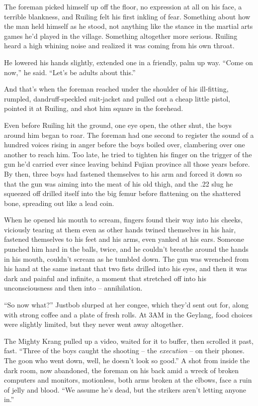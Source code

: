 The foreman picked himself up off the floor, no expression at all
on his face, a terrible blankness, and Ruiling felt his first
inkling of fear. Something about how the man held himself as he
stood, not anything like the stance in the martial arts games he'd
played in the village. Something altogether more serious. Ruiling
heard a high whining noise and realized it was coming from his own
throat.

He lowered his hands slightly, extended one in a friendly, palm up
way. ``Come on now,'' he said. ``Let's be adults about this.''

And that's when the foreman reached under the shoulder of his
ill-fitting, rumpled, dandruff-speckled suit-jacket and pulled out
a cheap little pistol, pointed it at Ruiling, and shot him square
in the forehead.

Even before Ruiling hit the ground, one eye open, the other shut,
the boys around him began to roar. The foreman had one second to
register the sound of a hundred voices rising in anger before the
boys boiled over, clambering over one another to reach him. Too
late, he tried to tighten his finger on the trigger of the gun he'd
carried ever since leaving behind Fujian province all those years
before. By then, three boys had fastened themselves to his arm and
forced it down so that the gun was aiming into the meat of his old
thigh, and the .22 slug he squeezed off drilled itself into the big
femur before flattening on the shattered bone, spreading out like a
lead coin.

When he opened his mouth to scream, fingers found their way into
his cheeks, viciously tearing at them even as other hands twined
themselves in his hair, fastened themselves to his feet and his
arms, even yanked at his ears. Someone punched him hard in the
balls, twice, and he couldn't breathe around the hands in his
mouth, couldn't scream as he tumbled down. The gun was wrenched
from his hand at the same instant that two fists drilled into his
eyes, and then it was dark and painful and infinite, a moment that
stretched off into his unconsciousness and then into --
annihilation.

\tb

``So now what?'' Justbob slurped at her congee, which they'd sent out
for, along with strong coffee and a plate of fresh rolls. At 3AM in
the Geylang, food choices were slightly limited, but they never
went away altogether.

The Mighty Krang pulled up a video, waited for it to buffer, then
scrolled it past, fast. ``Three of the boys caught the shooting --
the \emph{execution} -- on their phones. The goon who went down,
well, he doesn't look so good.'' A shot from inside the dark room,
now abandoned, the foreman on his back amid a wreck of broken
computers and monitors, motionless, both arms broken at the elbows,
face a ruin of jelly and blood. ``We assume he's dead, but the
strikers aren't letting anyone in.''

